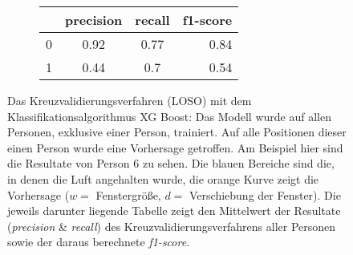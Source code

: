 \begin{figure}[ht]
  \begin{subfigure}{1\textwidth}
      \begin{center}
          \begin{tabular}{ | l | c | c | r | }
            \hline
             & precision & recall & f1-score \\ \hline
            0 & 0.92 & 0.77 & 0.84 \\ \hline
            1 & 0.44 & 0.7  & 0.54 \\
            \hline
          \end{tabular}
      \end{center}
  \end{subfigure}
    \caption{Das Kreuzvalidierungsverfahren (LOSO) mit dem Klassifikationsalgorithmus XG Boost: Das Modell wurde auf allen Personen, exklusive einer Person, trainiert. Auf alle Positionen dieser einen Person wurde eine Vorhersage getroffen. Am Beispiel hier sind die Resultate von Person 6 zu sehen. Die blauen Bereiche sind die, in denen die Luft angehalten wurde, die orange Kurve zeigt die Vorhersage ($w=$ Fenstergröße, $d=$ Verschiebung der Fenster). Die jeweils darunter liegende Tabelle zeigt den Mittelwert der Resultate (\textit{precision} \& \textit{recall}) des Kreuzvalidierungsverfahrens aller Personen sowie der daraus berechnete \textit{f1-score}.}
\label{evaluation:xgboost_loso:person6}
\end{figure}

